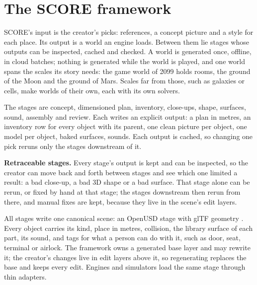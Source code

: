 \section{The SCORE framework}\label{the-score-framework}

SCORE's input is the creator's picks: references, a concept picture and a style for each place. Its output is a world an engine loads. Between them lie stages whose outputs can be inspected, cached and checked. A world is generated once, offline, in cloud batches; nothing is generated while the world is played, and one world spans the scales its story needs: the game world of 2099 holds rooms, the ground of the Moon and the ground of Mars. Scales far from those, such as galaxies or cells, make worlds of their own, each with its own solvers.

The stages are concept, dimensioned plan, inventory, close-ups, shape, surfaces, sound, assembly and review. Each writes an explicit output: a plan in metres, an inventory row for every object with its parent, one clean picture per object, one model per object, baked surfaces, sounds. Each output is cached, so changing one pick reruns only the stages downstream of it.

\textbf{Retraceable stages.} Every stage's output is kept and can be inspected, so the creator can move back and forth between stages and see which one limited a result: a bad close-up, a bad 3D shape or a bad surface. That stage alone can be rerun, or fixed by hand at that stage; the stages downstream then rerun from there, and manual fixes are kept, because they live in the scene's edit layers.

All stages write one canonical scene: an OpenUSD stage \citep{openusd} with glTF geometry \citep{gltf2}. Every object carries its kind, place in metres, collision, the library surface of each part, its sound, and tags for what a person can do with it, such as door, seat, terminal or airlock. The framework owns a generated base layer and may rewrite it; the creator's changes live in edit layers above it, so regenerating replaces the base and keeps every edit. Engines and simulators load the same stage through thin adapters.

\begin{center}\end{center}
